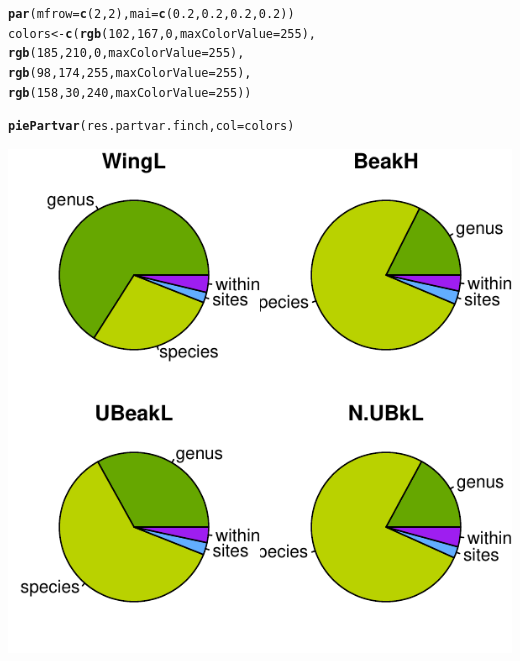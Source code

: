 \documentclass[12pt]{article}\usepackage[]{graphicx}\usepackage[]{color}
\makeatletter
\def\maxwidth{ %
  \ifdim\Gin@nat@width>\linewidth
    \linewidth
  \else
    \Gin@nat@width
  \fi
}
\newcommand{\hlnum}[1]{\textcolor[rgb]{0.686,0.059,0.569}{#1}}%
\newcommand{\hlstd}[1]{\textcolor[rgb]{0.345,0.345,0.345}{#1}}%
\newcommand{\hlkwb}[1]{\textcolor[rgb]{0.69,0.353,0.396}{#1}}%
\newcommand{\hlkwc}[1]{\textcolor[rgb]{0.333,0.667,0.333}{#1}}%
\newcommand{\hlkwd}[1]{\textcolor[rgb]{0.737,0.353,0.396}{\textbf{#1}}}%
\newenvironment{kframe}{%
 \def\at@end@of@kframe{}%
 \ifinner\ifhmode%
  \def\at@end@of@kframe{\end{minipage}}%
  \begin{minipage}{\columnwidth}%
 \fi\fi%
 \def\FrameCommand##1{\hskip\@totalleftmargin \hskip-\fboxsep
 \colorbox{shadecolor}{##1}\hskip-\fboxsep
     \hskip-\linewidth \hskip-\@totalleftmargin \hskip\columnwidth}%
 \MakeFramed {\advance\hsize-\width
   \@totalleftmargin\z@ \linewidth\hsize
   \@setminipage}}%
 {\par\unskip\endMakeFramed%
 \at@end@of@kframe}
\newenvironment{knitrout}{}{} %
\makeatother
\begin{document}
\begin{knitrout}
\color{fgcolor}\begin{kframe}
\begin{alltt}
\hlkwd{par}\hlstd{(}\hlkwc{mfrow}\hlstd{=}\hlkwd{c}\hlstd{(}\hlnum{2}\hlstd{,}\hlnum{2}\hlstd{),} \hlkwc{mai}\hlstd{=}\hlkwd{c}\hlstd{(}\hlnum{0.2}\hlstd{,}\hlnum{0.2}\hlstd{,}\hlnum{0.2}\hlstd{,}\hlnum{0.2}\hlstd{))}
\hlstd{colors}\hlkwb{<-}\hlkwd{c}\hlstd{(}\hlkwd{rgb}\hlstd{(}\hlnum{102}\hlstd{,}\hlnum{167}\hlstd{,}\hlnum{0}\hlstd{,}  \hlkwc{maxColorValue} \hlstd{=} \hlnum{255}\hlstd{),}
          \hlkwd{rgb}\hlstd{(}\hlnum{185}\hlstd{,}\hlnum{210}\hlstd{,}\hlnum{0}\hlstd{,}  \hlkwc{maxColorValue} \hlstd{=} \hlnum{255}\hlstd{),}
          \hlkwd{rgb}\hlstd{(}\hlnum{98}\hlstd{,}\hlnum{174}\hlstd{,}\hlnum{255}\hlstd{,}  \hlkwc{maxColorValue} \hlstd{=} \hlnum{255}\hlstd{),}
          \hlkwd{rgb}\hlstd{(}\hlnum{158}\hlstd{,}\hlnum{30}\hlstd{,}\hlnum{240}\hlstd{,}  \hlkwc{maxColorValue} \hlstd{=} \hlnum{255}\hlstd{))}

\hlkwd{piePartvar}\hlstd{(res.partvar.finch,} \hlkwc{col}\hlstd{=colors)}
\end{alltt}
\end{kframe}

{\centering \includegraphics[width=\maxwidth]{figure/unnamed-chunk-241} 

}
\end{knitrout}
\end{document}
